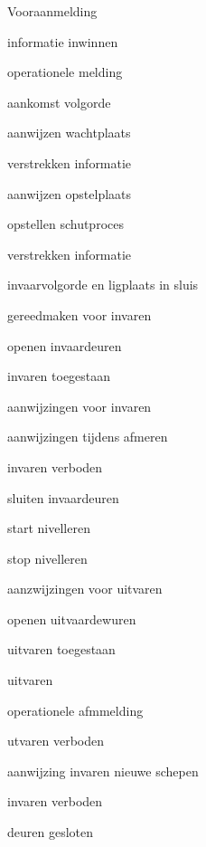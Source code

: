 \begin{itemize}
	\begin{minipage}{0.4\linewidth}
		\item Vooraanmelding
		\item informatie inwinnen
		\item operationele melding
		\item aankomst volgorde
		\item aanwijzen wachtplaats
		\item verstrekken informatie
		\item aanwijzen opstelplaats
		\item opstellen schutproces
		\item verstrekken informatie
		\item invaarvolgorde en ligplaats in sluis
		
	\end{minipage}
	\begin{minipage}{0.4\linewidth}
		
		\item gereedmaken voor invaren
		\item openen invaardeuren
		\item invaren toegestaan
		\item aanwijzingen voor invaren
		\item aanwijzingen tijdens afmeren
		\item invaren verboden
		\item sluiten invaardeuren
		\item start nivelleren
		\item stop nivelleren
		\item aanzwijzingen voor uitvaren
		\item openen uitvaardewuren
		\item uitvaren toegestaan
		
	\end{minipage}
	\begin{minipage}{0.4\linewidth}
		\item uitvaren
		\item operationele afmmelding
		\item utvaren verboden
		\item aanwijzing invaren nieuwe schepen
		\item invaren verboden
		\item deuren gesloten
	\end{minipage}
\end{itemize}







